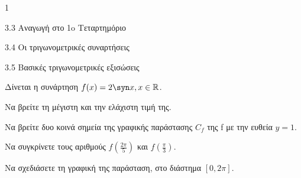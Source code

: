 \begin{ylh}{1}
\item 3.3 Αναγωγή στο 1o Τεταρτημόριο
\item 3.4 Οι τριγωνομετρικές συναρτήσεις
\item 3.5 Βασικές τριγωνομετρικές εξισώσεις
\end{ylh}
Δίνεται η συνάρτηση $f(x) = 2\syn  x, x \in \mathbb{R}$.
\begin{alist}
\item Να βρείτε τη μέγιστη και την ελάχιστη τιμή της.
\item Να βρείτε δυο κοινά σημεία της γραφικής παράστασης $C_f$ της f με την ευθεία $y = 1$.
\item Να συγκρίνετε τους αριθμούς $f\left(\frac{2\pi}{5}\right)$ και $f\left(\frac{\pi}{3}\right)$.
\item Να σχεδιάσετε τη γραφική της παράσταση, στο διάστημα $[0, 2\pi]$.
\end{alist}

